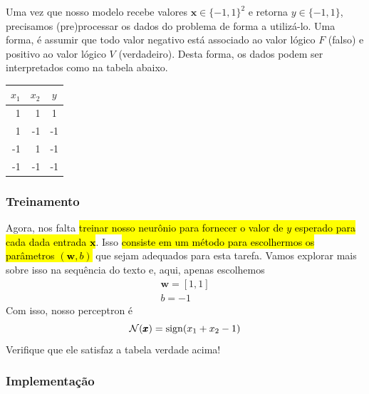 Uma vez que nosso modelo recebe valores $\pmb{x}\in \{-1,1\}^2$ e retorna $y\in\{-1,1\}$, precisamos (pre)processar os dados do problema de forma a utilizá-lo. Uma forma, é assumir que todo valor negativo está associado ao valor lógico $F$ (falso) e positivo ao valor lógico $V$ (verdadeiro). Desta forma, os dados podem ser interpretados como na tabela abaixo.

\begin{center}
  \begin{tabular}{rr|c}
    $x_1$ & $x_2$ & $y$\\\hline
    1 & 1 & 1\\
    1 & -1 & -1\\
    -1 & 1 & -1\\
    -1 & -1 & -1\\\hline
  \end{tabular}
\end{center}
    
    
\subsubsection{Treinamento}

Agora, nos falta \hl{treinar nosso neurônio para fornecer o valor de $y$ esperado para cada dada entrada $\pmb{x}$}. Isso \hl{consiste em um método para escolhermos os parâmetros $(\pmb{w},b)$} que sejam adequados para esta tarefa. Vamos explorar mais sobre isso na sequência do texto e, aqui, apenas escolhemos
\begin{gather}
  \pmb{w} = [1, 1]\\
  b = -1
\end{gather}
Com isso, nosso perceptron é
\begin{equation}
  \mathcal{N}(\pmb{x}) = \operatorname{sign}(x_1 + x_2 - 1)
\end{equation}
Verifique que ele satisfaz a tabela verdade acima!


\subsubsection{Implementação}

